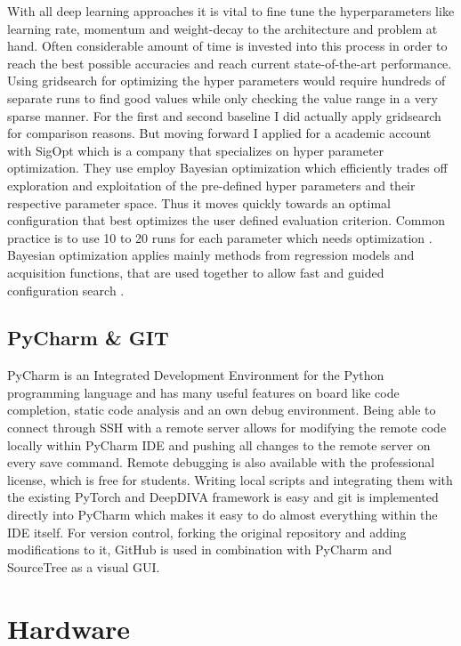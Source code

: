 With all deep learning approaches it is vital to fine tune the hyperparameters like learning rate, momentum and weight-decay to the architecture and problem at hand. Often considerable amount of time is invested into this process in order to reach the best possible accuracies and reach current state-of-the-art performance. Using gridsearch for optimizing the hyper parameters would require hundreds of separate runs to find good values while only checking the value range in a very sparse manner. For the first and second baseline I did actually apply gridsearch for comparison reasons. But moving forward I applied for a academic account with SigOpt \cite{sigopt} which is a company that specializes on hyper parameter optimization. They use employ Bayesian optimization which efficiently trades off exploration and exploitation of the pre-defined hyper parameters and their respective parameter space. Thus it moves quickly towards an optimal configuration that best optimizes the user defined evaluation criterion. Common practice is to use 10 to 20 runs for each parameter which needs optimization \cite{sigoptObservationBudget}. Bayesian optimization applies mainly methods from regression models and acquisition functions, that are used together to allow fast and guided configuration search \cite{sigoptBayesian}.

\subsection{PyCharm & GIT}

PyCharm \cite{PyCharm} is an Integrated Development Environment for the Python programming language and has many useful features on board like code completion, static code analysis and an own debug environment. Being able to connect through SSH with a remote server allows for modifying the remote code locally within PyCharm IDE and pushing all changes to the remote server on every save command. Remote debugging is also available with the professional license, which is free for students. Writing local scripts and integrating them with the existing PyTorch and DeepDIVA framework is easy and git is implemented directly into PyCharm which makes it easy to do almost everything within the IDE itself.
For version control, forking the original repository and adding modifications to it, GitHub \cite{GitHub} is used in combination with PyCharm and SourceTree \cite{SourceTree} as a visual GUI.

\section{Hardware}

